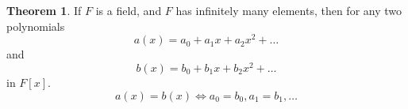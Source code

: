 \documentclass{article}
\theoremstyle{definition}
\newtheorem{theorem}{Theorem}
\theoremstyle{definition}
\begin{document}
\begin{theorem} 
  If $F$ is a field, and $F$ has infinitely many elements, then for any two polynomials 
  $$a(x) = a_0 + a_1x + a_2x^2 + \dots$$ and 
  $$b(x) = b_0 + b_1x + b_2x^2 + \dots$$ 
  in $F[x]$.
  $$
    a(x) = b(x) \iff a_0 = b_0, a_1 = b_1, \dots
  $$
\end{theorem} 
\end{document}
